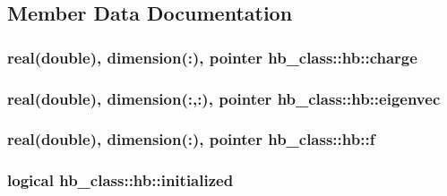 \subsection{Member Data Documentation}
\hypertarget{structhb__class_1_1hb_ae5d949ad83b1c2491acca3fedb59127f}{
\subsubsection[{charge}]{\setlength{\rightskip}{0pt plus 5cm}real(double), dimension(\-:), pointer hb\-\_\-class\-::hb\-::charge\hspace{0.3cm}{\ttfamily [private]}}}\label{structhb__class_1_1hb_ae5d949ad83b1c2491acca3fedb59127f}
\hypertarget{structhb__class_1_1hb_ac62b62b36a6c37ba8477efc35c6f97bf}{
\subsubsection[{eigenvec}]{\setlength{\rightskip}{0pt plus 5cm}real(double), dimension(\-:,\-:), pointer hb\-\_\-class\-::hb\-::eigenvec\hspace{0.3cm}{\ttfamily [private]}}}\label{structhb__class_1_1hb_ac62b62b36a6c37ba8477efc35c6f97bf}
\hypertarget{structhb__class_1_1hb_af871a155778593b68d1a0b12f20a9296}{
\subsubsection[{f}]{\setlength{\rightskip}{0pt plus 5cm}real(double), dimension(\-:), pointer hb\-\_\-class\-::hb\-::f\hspace{0.3cm}{\ttfamily [private]}}}\label{structhb__class_1_1hb_af871a155778593b68d1a0b12f20a9296}
\hypertarget{structhb__class_1_1hb_ab15f7134343b95cad3a633262c4d1ae6}{
\subsubsection[{initialized}]{\setlength{\rightskip}{0pt plus 5cm}logical hb\-\_\-class\-::hb\-::initialized\hspace{0.3cm}{\ttfamily [private]}}}\label{structhb__class_1_1hb_ab15f7134343b95cad3a633262c4d1ae6}
